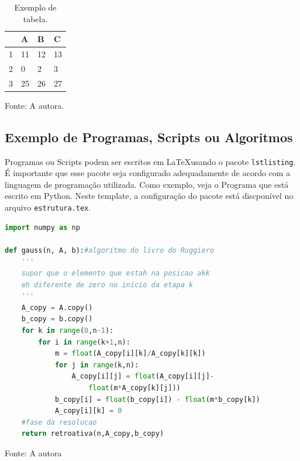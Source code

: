\begin{table}[h]
\centering
\caption{Exemplo de tabela.}
\begin{tabular}{|l|l|l|l|}
\hline
& \textbf{A} & \textbf{B} & \textbf{C} \\
\hline
1 & 11         & 12         & 13         \\
2 & 0          & 2          & 3          \\
3 & 25         & 26         & 27    \\     
\hline    
\end{tabular}
\vspace{0.2 cm}

\small{Fonte: A autora.}
\end{table}

\normalsize



\subsection{Exemplo de Programas, Scripts ou Algoritmos}

Programas ou Scripts podem ser escritos em \LaTeX usando o pacote \texttt{lstlisting}. É importante que esse pacote seja configurado adequadamente de acordo com a linguagem de programação utilizada. Como exemplo, veja o Programa que está escrito em Python. Neste template, a configuração do pacote está discponível no arquivo \texttt{estrutura.tex}.

\begin{lstlisting}[caption={Função Eliminação de Gauss},label={prog:gauss},language=Python]
import numpy as np

def gauss(n, A, b):#algoritmo do livro do Ruggiero
    '''
    supor que o elemento que estah na posicao akk 
    eh diferente de zero no inicio da etapa k
    '''
    A_copy = A.copy()
    b_copy = b.copy()
    for k in range(0,n-1):
        for i in range(k+1,n):
            m = float(A_copy[i][k]/A_copy[k][k])
            for j in range(k,n):
                A_copy[i][j] = float(A_copy[i][j]-
                    float(m*A_copy[k][j]))
            b_copy[i] = float(b_copy[i]) - float(m*b_copy[k])
            A_copy[i][k] = 0
    #fase da resolucao
    return retroativa(n,A_copy,b_copy)
\end{lstlisting}
\small{Fonte: A autora}

\normalsize


 \lipsum[1-2]



